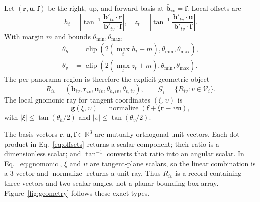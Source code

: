 \documentclass[a4paper,9pt]{extarticle}
\newcommand{\R}{\mathbb R}
\newcommand{\clip}{\operatorname{clip}}
\newcommand{\normalize}{\operatorname{normalize}}
\begin{document}
Let $(\mathbf r,\mathbf u,\mathbf f)$ be the right, up, and forward basis at $\bar{\mathbf b}_{iv}=\mathbf f$. Local offsets are
\begin{equation}
 h_t=\left|\tan^{-1}\frac{\mathbf b'_{tv}\cdot\mathbf r}
 {\mathbf b'_{tv}\cdot\mathbf f}\right|,\quad
 z_t=\left|\tan^{-1}\frac{\mathbf b'_{tv}\cdot\mathbf u}
 {\mathbf b'_{tv}\cdot\mathbf f}\right|.
 \label{eq:offsets}
\end{equation}
With margin $m$ and bounds $\theta_{\min},\theta_{\max}$,
\begin{align}
 \theta_h&=\clip\!\left(2(\max_t h_t+m),
 \theta_{\min},\theta_{\max}\right),\\
 \theta_v&=\clip\!\left(2(\max_t z_t+m),
 \theta_{\min},\theta_{\max}\right).
 \label{eq:fov}
\end{align}
The per-panorama region is therefore the explicit geometric object
\begin{equation}
 R_{iv}=\left(\bar{\mathbf b}_{iv},\mathbf r_{iv},
 \mathbf u_{iv},\theta_{h,iv},\theta_{v,iv}\right),
 \qquad
 \mathcal G_i=\{R_{iv}:v\in\mathcal V_i\}.
 \label{eq:regionobject}
\end{equation}
The local gnomonic ray for tangent coordinates $(\xi,\upsilon)$ is
\begin{equation}
 \mathbf g(\xi,\upsilon)=
 \normalize(\mathbf f+\xi\mathbf r-\upsilon\mathbf u),
 \label{eq:gnomonic}
\end{equation}
with $|\xi|\le\tan(\theta_h/2)$ and
$|\upsilon|\le\tan(\theta_v/2)$.

The basis vectors $\mathbf r,\mathbf u,\mathbf f\in\R^3$ are mutually
orthogonal unit vectors. Each dot product in Eq.~\ref{eq:offsets} returns a
scalar component; their ratio is a dimensionless scalar; and
$\tan^{-1}$ converts that ratio into an angular scalar. In
Eq.~\ref{eq:gnomonic}, $\xi$ and $\upsilon$ are tangent-plane scalars, so the
linear combination is a 3-vector and $\normalize$ returns a unit ray. Thus
$R_{iv}$ is a record containing three vectors and two scalar angles, not a
planar bounding-box array. Figure~\ref{fig:geometry} follows these exact types.
\end{document}
